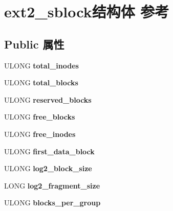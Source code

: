 \hypertarget{structext2__sblock}{}\section{ext2\+\_\+sblock结构体 参考}
\label{structext2__sblock}
\subsection*{Public 属性}
\begin{DoxyCompactItemize}
\item 
\mbox{\label{structext2__sblock_a6bac9a4b34f6ee804f99194cd9003d75}} 
U\+L\+O\+NG {\bfseries total\+\_\+inodes}
\item 
\mbox{\label{structext2__sblock_ab1c5d02c09ac9995a132ad1335a27858}} 
U\+L\+O\+NG {\bfseries total\+\_\+blocks}
\item 
\mbox{\label{structext2__sblock_a41f3c1249eb4f3879ea25a359cb9c4d6}} 
U\+L\+O\+NG {\bfseries reserved\+\_\+blocks}
\item 
\mbox{\label{structext2__sblock_a33fa40fa1e1710565f97ddde4e546300}} 
U\+L\+O\+NG {\bfseries free\+\_\+blocks}
\item 
\mbox{\label{structext2__sblock_a83aa3b526a52f2b155c96a31be0ad2c5}} 
U\+L\+O\+NG {\bfseries free\+\_\+inodes}
\item 
\mbox{\label{structext2__sblock_af42a31babbbdd32f3994bee01828e8b2}} 
U\+L\+O\+NG {\bfseries first\+\_\+data\+\_\+block}
\item 
\mbox{\label{structext2__sblock_a609c9a9091092439010b6394f4922003}} 
U\+L\+O\+NG {\bfseries log2\+\_\+block\+\_\+size}
\item 
\mbox{\label{structext2__sblock_a7c8da6d5f316813e540685818d8ecbfc}} 
L\+O\+NG {\bfseries log2\+\_\+fragment\+\_\+size}
\item 
\mbox{\label{structext2__sblock_ae02bc7a7c756ec1b43846461ad87e17e}} 
U\+L\+O\+NG {\bfseries blocks\+\_\+per\+\_\+group}

\end{DoxyCompactItemize}
